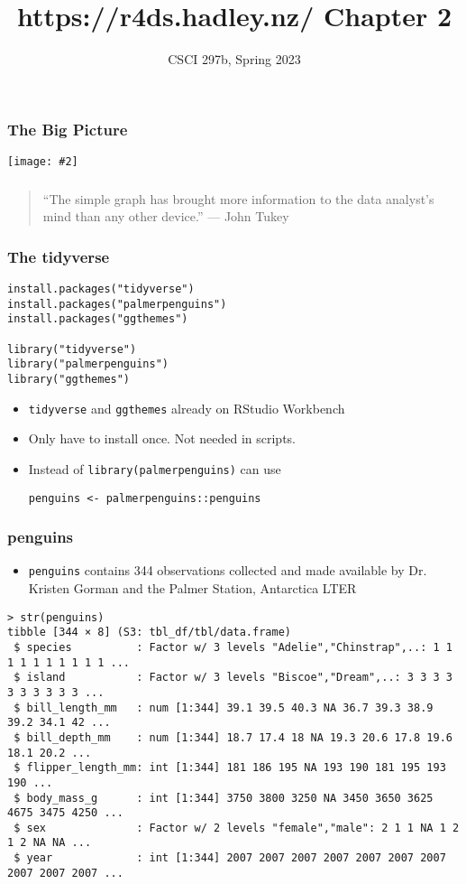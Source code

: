 \documentclass{beamer}
\title{{https://r4ds.hadley.nz/} Chapter 2}
\author{CSCI 297b, Spring 2023}
\newcommand{\bi}{\begin{itemize}}
\newcommand{\li}{\item}
\newcommand{\ei}{\end{itemize}}
\newcommand{\fig}[2]{\centerline{\texttt{[image: \#2]}}}
\newcommand{\bfr}[1]{\begin{frame}[fragile]\frametitle{{ #1 }}}
\begin{document}
\begin{frame}
\maketitle
\end{frame}

\bfr{The Big Picture}
\fig{1}{whole-game.png}
\end{frame}

\bfr{}
\begin{quotation}

“The simple graph has brought more information to the data analyst’s mind than any other device.” — John Tukey
\end{quotation}
\end{frame}

\bfr{The tidyverse}
\begin{verbatim}
install.packages("tidyverse")
install.packages("palmerpenguins")
install.packages("ggthemes")

library("tidyverse")
library("palmerpenguins")
library("ggthemes")
\end{verbatim}
\bi
\li {\tt tidyverse} and {\tt ggthemes} already on RStudio Workbench
\li Only have to install once.  Not needed in scripts.
\li Instead of  {\tt library(palmerpenguins)} can use
\begin{verbatim}
penguins <- palmerpenguins::penguins
\end{verbatim}
\ei
\end{frame}

\bfr{penguins}
\bi
\li {\tt penguins} contains 344 observations collected and made available by Dr. Kristen Gorman and the Palmer Station, Antarctica LTER
\ei
\scriptsize
\begin{verbatim}
> str(penguins)
tibble [344 × 8] (S3: tbl_df/tbl/data.frame)
 $ species          : Factor w/ 3 levels "Adelie","Chinstrap",..: 1 1 1 1 1 1 1 1 1 1 ...
 $ island           : Factor w/ 3 levels "Biscoe","Dream",..: 3 3 3 3 3 3 3 3 3 3 ...
 $ bill_length_mm   : num [1:344] 39.1 39.5 40.3 NA 36.7 39.3 38.9 39.2 34.1 42 ...
 $ bill_depth_mm    : num [1:344] 18.7 17.4 18 NA 19.3 20.6 17.8 19.6 18.1 20.2 ...
 $ flipper_length_mm: int [1:344] 181 186 195 NA 193 190 181 195 193 190 ...
 $ body_mass_g      : int [1:344] 3750 3800 3250 NA 3450 3650 3625 4675 3475 4250 ...
 $ sex              : Factor w/ 2 levels "female","male": 2 1 1 NA 1 2 1 2 NA NA ...
 $ year             : int [1:344] 2007 2007 2007 2007 2007 2007 2007 2007 2007 2007 ...
\end{verbatim}
\end{frame}
\end{document}
